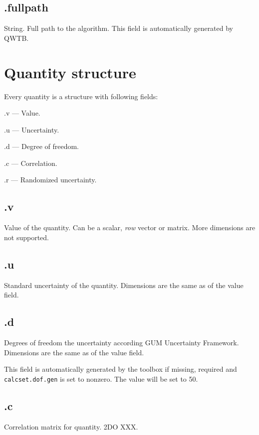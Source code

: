 \documentclass[12pt,a4paper,oneside]{report} %
\begin{document}
\subsection{\textsf{.fullpath}} %
String. Full path to the algorithm. This field is automatically generated by QWTB.

\section{Quantity structure} %
\label{structquantity}
Every quantity is a structure with following fields:
\begin{tightdesc}
        \item [\textsf{.v}] --- Value.
        \item [\textsf{.u}] --- Uncertainty.
        \item [\textsf{.d}] --- Degree of freedom.
        \item [\textsf{.c}] --- Correlation.
        \item [\textsf{.r}] --- Randomized uncertainty.
\end{tightdesc}

\subsection{\textsf{.v}} %
Value of the quantity. Can be a scalar, \emph{row} vector or matrix. More dimensions are not supported.

\subsection{\textsf{.u}} %
Standard uncertainty of the quantity. Dimensions are the same as of the value field. 

\subsection{\textsf{.d}} %
Degrees of freedom the uncertainty according GUM Uncertainty Framework. Dimensions are the same as of the value field.

This field is automatically generated by the toolbox if missing, required and \lstinline{calcset.dof.gen}
is set to nonzero. The value will be set to 50.

\subsection{\textsf{.c}} %
Correlation matrix for quantity. 2DO XXX.
\end{document}
